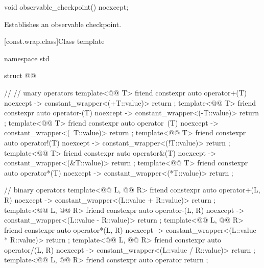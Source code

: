 %
\begin{itemdecl}
void observable_checkpoint() noexcept;
\end{itemdecl}

\begin{itemdescr}
\pnum
\effects
Establishes an observable checkpoint.
\end{itemdescr}

[const.wrap.class]{Class template }

\begin{codeblock}
namespace std {
  struct @@ {                                                 // \expos
    // unary operators
    template<@@ T>
      friend constexpr auto operator+(T) noexcept -> constant_wrapper<(+T::value)>
        { return {}; }
    template<@@ T>
      friend constexpr auto operator-(T) noexcept -> constant_wrapper<(-T::value)>
        { return {}; }
    template<@@ T>
      friend constexpr auto operator~(T) noexcept -> constant_wrapper<(~T::value)>
        { return {}; }
    template<@@ T>
      friend constexpr auto operator!(T) noexcept -> constant_wrapper<(!T::value)>
        { return {}; }
    template<@@ T>
      friend constexpr auto operator&(T) noexcept -> constant_wrapper<(&T::value)>
        { return {}; }
    template<@@ T>
      friend constexpr auto operator*(T) noexcept -> constant_wrapper<(*T::value)>
        { return {}; }

    // binary operators
    template<@@ L, @@ R>
      friend constexpr auto operator+(L, R) noexcept -> constant_wrapper<(L::value + R::value)>
        { return {}; }
    template<@@ L, @@ R>
      friend constexpr auto operator-(L, R) noexcept -> constant_wrapper<(L::value - R::value)>
        { return {}; }
    template<@@ L, @@ R>
      friend constexpr auto operator*(L, R) noexcept -> constant_wrapper<(L::value * R::value)>
        { return {}; }
    template<@@ L, @@ R>
      friend constexpr auto operator/(L, R) noexcept -> constant_wrapper<(L::value / R::value)>
        { return {}; }
    template<@@ L, @@ R>
      friend constexpr auto operator%
        { return {}; }

}}
\end{codeblock}
